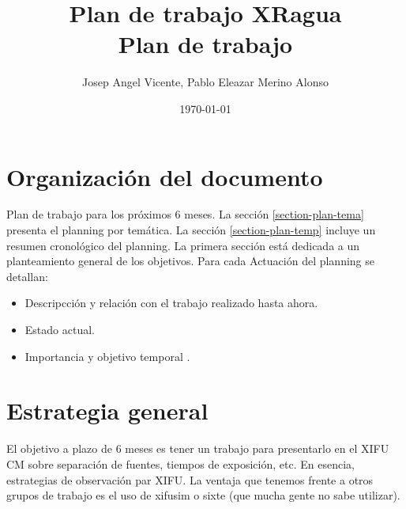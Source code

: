 \documentclass[letterpaper,12pt]{article}
\newcommand{\colblue}[1]{\color{blue} #1 \color{black}}
\begin{document}
\title{\Huge{\textbf{Plan de trabajo XRagua}} \\ Plan de trabajo}
\author{Josep Angel Vicente, Pablo Eleazar Merino Alonso}
\date{\today}
\maketitle
\section{Organizaci\'on del documento}
\label{section-intro}
Plan de trabajo para los pr\'oximos 6 meses. La secci\'on \ref{section-plan-tema} presenta el planning por tem\'atica. La secci\'on \ref{section-plan-temp} incluye un resumen cronol\'ogico del planning.
La primera secci\'on est\'a dedicada a un planteamiento general de los objetivos.
Para cada Actuaci\'on del planning se detallan: 
\begin{itemize}
\item Descripcci\'on y relaci\'on con el trabajo realizado hasta ahora. 
\item Estado actual.
\item Importancia y \colblue{objetivo temporal}. 
\end{itemize}
\section{Estrategia general}
\label{section-estrategia}
El objetivo a plazo de 6 meses es tener un trabajo para presentarlo en el XIFU CM sobre separaci\'on de fuentes, tiempos de exposici\'on, etc. En esencia, estrategias de observaci\'on par XIFU. La ventaja que tenemos frente a otros grupos de trabajo es el uso de xifusim o sixte (que mucha gente no sabe utilizar).
\end{document}
